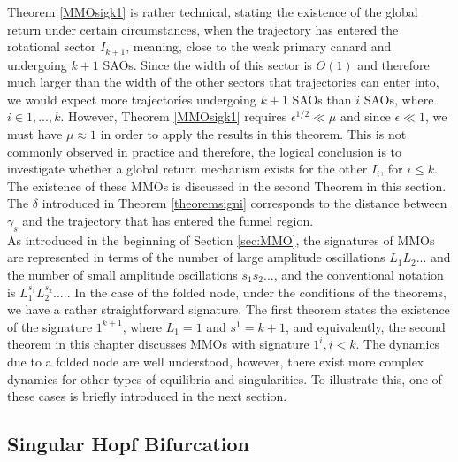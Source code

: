 Theorem \ref{MMOsigk1} is rather technical, stating the existence of the global return under certain circumstances, when the trajectory has entered the rotational sector $I_{k+1}$, meaning, close to the weak primary canard and undergoing $k+1$ SAOs. Since the width of this sector is $O(1)$ and therefore much larger than the width of the other sectors that trajectories can enter into, we would expect more trajectories undergoing $k+1$ SAOs than $i$ SAOs, where $i \in 1,...,k$.
However, Theorem \ref{MMOsigk1} requires $\epsilon^{1/2} \ll \mu$ and since $\epsilon \ll 1$, we must have $\mu \approx 1$ in order to apply the results in this theorem. This is not commonly observed in practice and therefore, the logical conclusion is to investigate whether a global return mechanism exists for the other $I_i$, for $i \leq k$. The existence of these MMOs is discussed in the second Theorem in this section. The $\delta$ introduced in Theorem \ref{theoremsigni} corresponds to the distance between
$\gamma_s$ and the trajectory that has entered the funnel region.\\

As introduced in the beginning of Section \ref{sec:MMO},  the signatures of MMOs are represented in terms of the number of large amplitude oscillations $L_1L_2...$ and the number of small amplitude oscillations $s_1s_2...$, and the conventional notation is $L_1^{s_1}L_2^{s_2}....$.
In the case of the folded node, under the conditions of the theorems, we have a rather straightforward signature. The first theorem states the existence of the signature $1^{k+1}$, where $L_1=1$ and $s^1=k+1$, and equivalently, the second theorem in this chapter discusses MMOs with signature $1^{i}, i<k$.
The dynamics due to a folded node are well understood, however, there exist more complex dynamics for other types of equilibria and singularities.
To illustrate this, one of these cases is briefly introduced in the next section.


\subsection{Singular Hopf Bifurcation}

